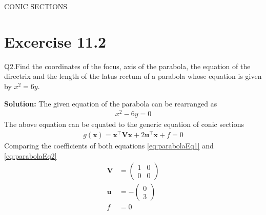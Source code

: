 \documentclass[12pt]{article}
\providecommand{\brak}[1]{\ensuremath{\left(#1\right)}}
\newcommand{\solution}{\noindent \textbf{Solution: }}
\newcommand{\myvec}[1]{\ensuremath{\begin{pmatrix}#1\end{pmatrix}}}
\let\vec\mathbf
\begin{document}
\begin{center}
\textbf\large{CONIC SECTIONS}

\end{center}
\section*{Excercise 11.2}

Q2.Find the coordinates of the focus, axis of the parabola, the equation of the directrix and the length of the latus rectum of a parabola whose equation is given by $x^2=6y$.

\solution
The given equation of the parabola can be rearranged as
\begin{align}
	\label{eq:parabolaEq1}
	x^2-6y=0
\end{align}
The above equation can be equated to the generic equation of conic sections
\begin{align}
	\label{eq:parabolaEq2}
	g\brak{\vec{x}}=\vec{x}^\top \vec{V}\vec{x}+2\vec{u}^\top \vec{x}+f=0
\end{align}
Comparing the coefficients of both equations \eqref{eq:parabolaEq1} and \eqref{eq:parabolaEq2}
\begin{align}
	\label{eq:eqV}
	\vec{V} &= \myvec{1&0\\0&0}\\
	\label{eq:eqU}
	\vec{u} &= -\myvec{0\\3}\\
	\label{eq:eqF}
	f &= 0
\end{align}
\end{document}

